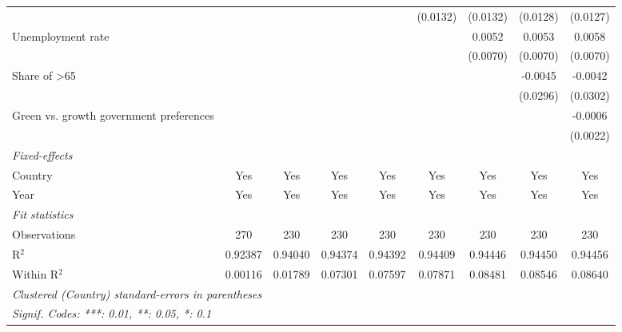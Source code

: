 \begin{table}[htbp]
\begin{tabular}{lcccccccc}
                                                            &          &          &                 &                 & (0.0132)        & (0.0132)        & (0.0128)        & (0.0127)\\   
      Unemployment rate                                     &          &          &                 &                 &                 & 0.0052          & 0.0053          & 0.0058\\   
                                                            &          &          &                 &                 &                 & (0.0070)        & (0.0070)        & (0.0070)\\   
      Share of >65                                          &          &          &                 &                 &                 &                 & -0.0045         & -0.0042\\   
                                                            &          &          &                 &                 &                 &                 & (0.0296)        & (0.0302)\\   
      Green vs. growth government preferences               &          &          &                 &                 &                 &                 &                 & -0.0006\\   
                                                            &          &          &                 &                 &                 &                 &                 & (0.0022)\\   
      \midrule
      \emph{Fixed-effects}\\
      Country                                               & Yes      & Yes      & Yes             & Yes             & Yes             & Yes             & Yes             & Yes\\  
      Year                                                  & Yes      & Yes      & Yes             & Yes             & Yes             & Yes             & Yes             & Yes\\  
      \midrule
      \emph{Fit statistics}\\
      Observations                                          & 270      & 230      & 230             & 230             & 230             & 230             & 230             & 230\\  
      R$^2$                                                 & 0.92387  & 0.94040  & 0.94374         & 0.94392         & 0.94409         & 0.94446         & 0.94450         & 0.94456\\  
      Within R$^2$                                          & 0.00116  & 0.01789  & 0.07301         & 0.07597         & 0.07871         & 0.08481         & 0.08546         & 0.08640\\  
      \midrule \midrule
      \multicolumn{9}{l}{\emph{Clustered (Country) standard-errors in parentheses}}\\
      \multicolumn{9}{l}{\emph{Signif. Codes: ***: 0.01, **: 0.05, *: 0.1}}\\
   \end{tabular}
\end{table}


